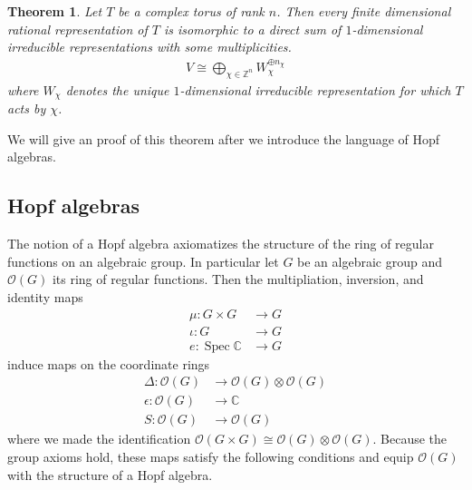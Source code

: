\documentclass{amsart}
\newcommand{\C}{\mathbb{C}}
\newcommand{\Z}{\mathbb{Z}}
\DeclareMathOperator{\Spec}{Spec}
\newcommand{\mc}[1]{\mathcal{#1}}
\numberwithin{equation}{section}
\theoremstyle{plain} %
\newtheorem{theorem}[equation]{Theorem}
\theoremstyle{definition}
\theoremstyle{remark}
\begin{document}
\begin{theorem}\label{thm:ratrep}
	Let $T$ be a complex torus of rank $n$.
	Then every finite dimensional rational representation of $T$
	is isomorphic
	to a direct sum of $1$-dimensional irreducible representations with some multiplicities.
	\begin{align*}
		V \cong \bigoplus_{\chi\in \Z^n} W_\chi^{\oplus n_\chi}
	\end{align*} where $W_\chi$ denotes the unique $1$-dimensional irreducible representation for which $T$ acts by $\chi$.
\end{theorem}
We will give an proof of this theorem after we introduce the language of Hopf algebras.

\subsection{Hopf algebras}
The notion of a Hopf algebra axiomatizes
the structure of the ring of regular functions on an algebraic group.
In particular let $G$ be an algebraic group and $\mc O(G)$ its ring of regular functions.
Then the multipliation,
inversion, and identity maps \begin{align*}
	\mu: G\times G & \to G \\
	\iota: G       & \to G \\
	e: \Spec \C    & \to G
\end{align*}
induce maps on the coordinate rings
\begin{align*}
	\Delta: \mc O(G)   & \to \mc O(G)\otimes \mc O(G) \\
	\epsilon: \mc O(G) & \to \C                       \\
	S: \mc O(G)        & \to \mc O(G)
\end{align*} where we made the identification $\mc O(G\times G) \cong \mc O(G)\otimes \mc O(G)$.
Because the group axioms hold, these maps satisfy the following conditions and equip
$\mc O(G)$ with the structure of a Hopf algebra.
\end{document}
